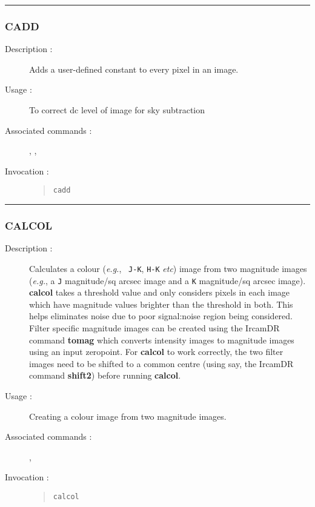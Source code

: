 \hrule
\subsubsection*{\label{CADD}CADD}

\begin{description}

\item[Description :] Adds a user-defined constant to every pixel in an image.

\item[Usage :] To correct dc level of image for sky subtraction

\item[Associated commands :] {\tt {}},
{\tt {}}, {\tt {}}

\item[Invocation :]

\begin{quote}{\tt  cadd  }\end{quote}

\end{description}

\hrule
\subsubsection*{\label{CALCOL}CALCOL}

\begin{description}

\item[Description :] Calculates a colour (\emph{e.g.}, {\tt
J-K}, {\tt H-K} \emph{etc}) image from two magnitude images
(\emph{e.g.}, a {\tt J} magnitude/sq arcsec image and a {\tt K}
magnitude/sq arcsec image).  {\bf calcol} takes a threshold value and
only considers pixels in each image which have magnitude values
brighter than the threshold in both.  This helps eliminates noise due
to poor signal:noise region being considered.  Filter specific
magnitude images can be created using the {\sc IrcamDR} command {\bf
tomag} which converts intensity images to magnitude images using an
input zeropoint.  For {\bf calcol} to work correctly, the two filter
images need to be shifted to a common centre (using say, the {\sc
IrcamDR} command {\bf shift2}) before running {\bf calcol}.

\item[Usage :] Creating a colour image from two magnitude images.

\item[Associated commands :] {\tt {}},
{\tt {}}

\item[Invocation :]

\begin{quote}{\tt calcol }\end{quote}

\end{description}

